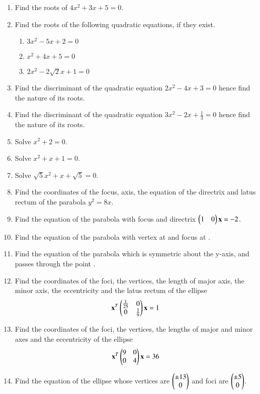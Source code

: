 \begin{enumerate}[label=\arabic*.,ref=\thesubsection.\theenumi]
\item Find the roots of $4x^2 + 3x + 5 = 0 $.
\item Find the roots of the following quadratic equations, if they exist.
\begin{enumerate}
\item 	$3x^2-5x+2 = 0$
\item 	$x^2+4x+5 = 0$
\item 	$2x^2-2\sqrt{2}x+1 = 0$
\end{enumerate}
%
\item Find the discriminant of the quadratic equation $2x^2-4x+3 = 0$
hence find the nature of its roots.
\item Find the discriminant of the quadratic equation $3x^2-2x+\frac{1}{3} = 0$
hence find the nature of its roots.
\item Solve $x^2+ 2 = 0 $.
\item Solve $x^2+ x+1 = 0 $.
\item Solve $\sqrt{5}x^2+ x+\sqrt{5} = 0 $.
%
\item Find the coordinates of the focus, axis, the equation of the directrix and latus rectum of the parabola $y^2 = 8x$.
%
\item Find the equation of the parabola with focus  and directrix $\begin{pmatrix}1 & 0\end{pmatrix}\mathbf{x} = -2$.\item Find the equation of the parabola with vertex at  and focus at .
\item Find the equation of the parabola which is symmetric about the y-axis, and passes through the point .
\item Find the coordinates of the foci, the vertices, the length of major axis, the minor axis, the eccentricity and the latus rectum of the ellipse 
%
\begin{align}
\mathbf{x}^T\begin{pmatrix}\frac{1}{25} & 0 \\ 0 & \frac{1}{9}\end{pmatrix}\mathbf{x} = 1
\end{align}
%
\item Find the coordinates of the foci, the vertices, the lengths of major and minor axes and the eccentricity of the ellipse 
%
\begin{align}
\mathbf{x}^T\begin{pmatrix}9 & 0 \\ 0 & 4\end{pmatrix}\mathbf{x} = 36
\end{align}
%
\item Find the equation of the ellipse whose vertices are $\begin{pmatrix}\pm 13\\ 0\end{pmatrix}$ and foci are $\begin{pmatrix}\pm 5\\ 0\end{pmatrix}$.

\end{enumerate}
